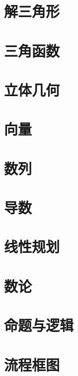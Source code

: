\documentclass[12pt,UTF-8]{MathCyclus_book}
\begin{document}
\chapter{解三角形}


\chapter{三角函数}


\chapter{立体几何}


\chapter{向量}


\chapter{数列}


\chapter{导数}


\chapter{线性规划}


\chapter{数论}


\chapter{命题与逻辑}


\chapter{流程框图}

\end{document}
